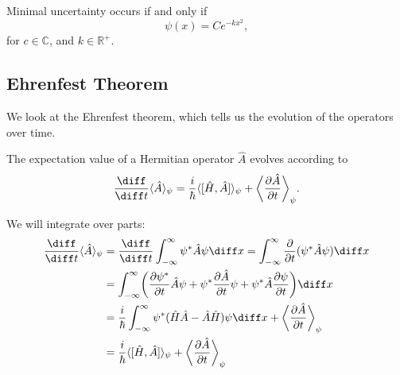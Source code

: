 \documentclass[12pt]{article}
\begin{document}
\begin{lemma}
	Minimal uncertainty occurs if and only if
	\[
		\psi(x) = C e^{-kx^2}
	,\]
	for $c \in \mathbb{C}$, and $k \in \mathbb{R}^{+}$.
\end{lemma}

\subsection{Ehrenfest Theorem}%
\label{sub:ehrenfest_theorem}

We look at the Ehrenfest theorem, which tells us the evolution of the operators over time.

\begin{theorem}
	The expectation value of a Hermitian operator $\hat A$ evolves according to
	\[
		\frac{\diff}{\diff t} \langle \hat A \rangle_{\psi} = \frac{i}{\hbar} \langle [\hat H, \hat A ] \rangle_{\psi} + \biggl\langle \frac{\partial \hat A}{\partial t} \biggr\rangle_{\psi}
	.\]
\end{theorem}

\begin{proofbox}
	We will integrate over parts:
	\begin{align*}
		\frac{\diff}{\diff t} \langle \hat A \rangle_{\psi} &= \frac{\diff}{\diff t} \int_{-\infty}^{\infty} \psi^{\ast} \hat A \psi \diff x = \int_{-\infty}^{\infty} \frac{\partial}{\partial t} (\psi^{\ast} \hat A \psi) \diff x \\
							   &= \int_{-\infty}^{\infty} \biggl( \frac{\partial \psi^{\ast}}{\partial t} \hat A \psi + \psi^{\ast} \frac{\partial \hat A}{\partial t} \psi + \psi^{\ast} \hat A \frac{\partial \psi}{\partial t} \biggr) \diff x \\
							   &= \frac{i}{\hbar} \int_{-\infty}^{\infty} \psi^{\ast} (\hat H \hat A - \hat A \hat H)\psi \diff x + \biggl\langle \frac{\partial \hat A}{\partial t} \biggr\rangle_{\psi} \\
							   &= \frac{i}{\hbar} \langle [\hat H, \hat A]\rangle_{\psi} + \biggl\langle \frac{\partial \hat A}{\partial t} \biggr\rangle_{\psi}
	\end{align*}
\end{proofbox}
\end{document}
